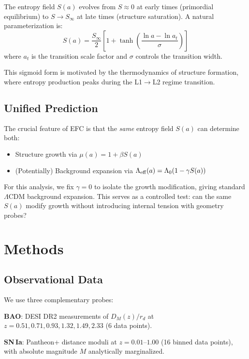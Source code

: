 \documentclass[12pt,a4paper]{article}
\begin{document}
The entropy field $S(a)$ evolves from $S \approx 0$ at early times (primordial equilibrium) 
to $S \to S_\infty$ at late times (structure saturation). A natural parameterization is:
\begin{equation}
S(a) = \frac{S_\infty}{2} \left[ 1 + \tanh\left( \frac{\ln a - \ln a_t}{\sigma} \right) \right]
\label{eq:entropy}
\end{equation}
where $a_t$ is the transition scale factor and $\sigma$ controls the transition width.

This sigmoid form is motivated by the thermodynamics of structure 
formation, where entropy production peaks during the L1$\to$L2 regime transition.

\subsection{Unified Prediction}

The crucial feature of EFC is that the \emph{same} entropy field $S(a)$ can determine both:
\begin{itemize}
\item Structure growth via $\mu(a) = 1 + \beta S(a)$
\item (Potentially) Background expansion via $\Lambda_{\rm eff}(a) = \Lambda_0(1 - \gamma S(a))$
\end{itemize}

For this analysis, we fix $\gamma = 0$ to isolate the growth modification, giving 
standard $\Lambda$CDM background expansion. This serves as a controlled test: can the 
same $S(a)$ modify growth without introducing internal tension with geometry probes?

\section{Methods}

\subsection{Observational Data}

We use three complementary probes:

\textbf{BAO}: DESI DR2 measurements of $D_M(z)/r_d$ at $z = 0.51, 0.71, 0.93, 1.32, 1.49, 2.33$ 
(6 data points).

\textbf{SN\,Ia}: Pantheon+ distance moduli at $z = 0.01$--$1.00$ (16 binned data points), 
with absolute magnitude $M$ analytically marginalized.
\end{document}
